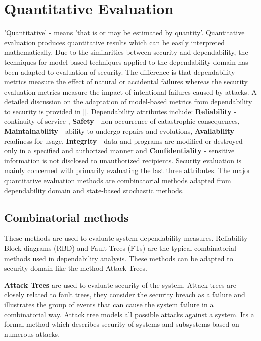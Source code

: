 \documentclass[pdftex,english,oribibl]{llncs}
\begin{document}
\section{Quantitative Evaluation}\label{sec:quantitative}
'Quantitative' - means 'that is or may be estimated by quantity'. Quantitative evaluation produces quantitative results which can be easily interpreted mathematically. Due to the similarities between security and dependability, the techniques for model-based techniques applied to the dependability domain has been adapted to evaluation of security. The difference is that dependability metrics measure the effect of natural or accidental failures whereas the security evaluation metrics measure the impact of intentional failures caused by attacks. A detailed discussion on the adaptation of model-based metrics from dependability to security is provided in [\citealp{1335467_Nicol}]. Dependability attributes include: \textbf{Reliability} - continuity of service , \textbf{Safety} - non-occurrence of catastrophic consequences, \textbf{Maintainability} - ability to undergo repairs and evolutions, \textbf{Availability} - readiness for usage, \textbf{Integrity} - data and programs are modified or destroyed only in a specified and authorized manner and \textbf{Confidentiality} - sensitive information is not disclosed to unauthorized recipients. Security evaluation is mainly concerned with primarily evaluating the last three attributes. The major quantitative evaluation methods are combinatorial methods adapted from dependability domain and state-based stochastic methods.

\subsection{Combinatorial methods}
These methods are used to evaluate system dependability measures. Reliability Block diagrams (RBD) and Fault Trees (FTs) are the typical combinatorial methods used in dependability analysis. These methods can be adapted to security domain like the method Attack Trees. 

\textbf{Attack Trees} are used to evaluate security of the system. Attack trees are closely related to fault trees, they consider the security breach as a failure and illustrates the group of events that can cause the system failure in a combinatorial way. Attack tree models all possible attacks against a system. Its a formal method which describes security of systems and subsystems based on numerous attacks. 
\end{document}
